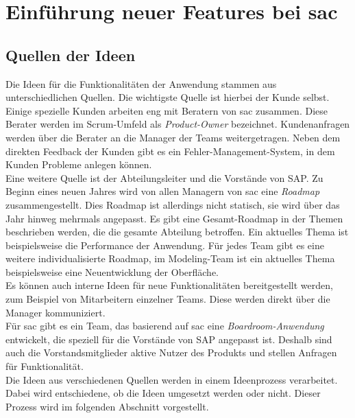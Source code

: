 \section{Einführung neuer Features bei \ac{sac}}\label{sec:feature}

\subsection{Quellen der Ideen}
Die Ideen für die Funktionalitäten der Anwendung stammen aus unterschiedlichen Quellen. Die wichtigste Quelle ist hierbei der Kunde selbst. 
Einige spezielle Kunden arbeiten eng mit Beratern von \ac{sac} zusammen. Diese Berater werden im Scrum-Umfeld als \textit{Product-Owner} bezeichnet. 
Kundenanfragen werden über die Berater an die Manager der Teams weitergetragen. Neben dem direkten Feedback der Kunden gibt es ein 
Fehler-Management-System, in dem Kunden Probleme anlegen können.\\
Eine weitere Quelle ist der Abteilungsleiter und die Vorstände von SAP. Zu Beginn eines neuen Jahres wird von allen Managern von \ac{sac}
eine \textit{Roadmap} zusammengestellt. Dies Roadmap ist allerdings nicht statisch, sie wird über das Jahr hinweg mehrmals angepasst. 
Es gibt eine Gesamt-Roadmap in der Themen beschrieben werden, die die gesamte Abteilung betroffen. Ein aktuelles Thema ist beispielsweise
die Performance der Anwendung. Für jedes Team gibt es eine weitere individualisierte Roadmap, im Modeling-Team ist ein aktuelles Thema beispielsweise 
eine Neuentwicklung der Oberfläche.\\
Es können auch interne Ideen für neue Funktionalitäten bereitgestellt werden, zum Beispiel von Mitarbeitern einzelner Teams.
Diese werden direkt über die Manager kommuniziert.\\
Für \ac{sac} gibt es ein Team, das basierend auf \ac{sac} eine \textit{Boardroom-Anwendung} entwickelt, die speziell für die Vorstände von SAP angepasst ist.
Deshalb sind auch die Vorstandsmitglieder aktive Nutzer des Produkts und stellen Anfragen für Funktionalität.\\
Die Ideen aus verschiedenen Quellen werden in einem Ideenprozess verarbeitet. Dabei wird entschiedene, ob die Ideen umgesetzt werden oder nicht. Dieser Prozess
wird im folgenden Abschnitt vorgestellt.

